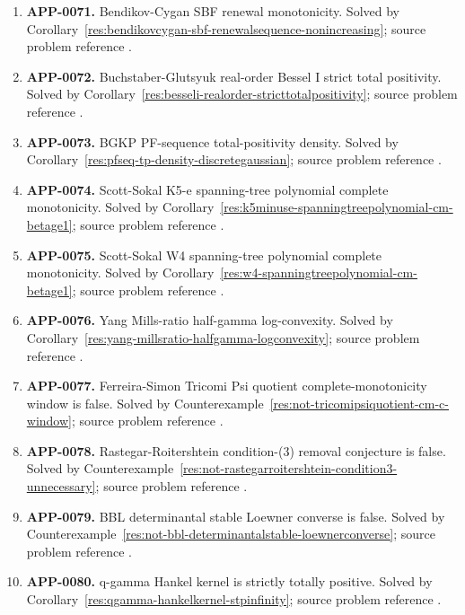 \documentclass[11pt]{article}
\numberwithin{equation}{section}
\theoremstyle{definition}
\theoremstyle{remark}
\newcommand{\1}{\mathbf 1}
\begin{document}
\begin{enumerate}
\item \label{ledger:app-0071}\textbf{APP-0071.} Bendikov-Cygan SBF renewal monotonicity. Solved by Corollary~\ref{res:bendikovcygan-sbf-renewalsequence-nonincreasing}; source problem reference \cite{app-app-0071-source}.
\item \label{ledger:app-0072}\textbf{APP-0072.} Buchstaber-Glutsyuk real-order Bessel I strict total positivity. Solved by Corollary~\ref{res:besseli-realorder-stricttotalpositivity}; source problem reference \cite{app-app-0072-source}.
\item \label{ledger:app-0073}\textbf{APP-0073.} BGKP PF-sequence total-positivity density. Solved by Corollary~\ref{res:pfseq-tp-density-discretegaussian}; source problem reference \cite{app-app-0073-source}.
\item \label{ledger:app-0074}\textbf{APP-0074.} Scott-Sokal K5-e spanning-tree polynomial complete monotonicity. Solved by Corollary~\ref{res:k5minuse-spanningtreepolynomial-cm-betage1}; source problem reference \cite{app-app-0074-source}.
\item \label{ledger:app-0075}\textbf{APP-0075.} Scott-Sokal W4 spanning-tree polynomial complete monotonicity. Solved by Corollary~\ref{res:w4-spanningtreepolynomial-cm-betage1}; source problem reference \cite{app-app-0074-source}.
\item \label{ledger:app-0076}\textbf{APP-0076.} Yang Mills-ratio half-gamma log-convexity. Solved by Corollary~\ref{res:yang-millsratio-halfgamma-logconvexity}; source problem reference \cite{app-app-0076-source}.
\item \label{ledger:app-0077}\textbf{APP-0077.} Ferreira-Simon Tricomi Psi quotient complete-monotonicity window is false. Solved by Counterexample~\ref{res:not-tricomipsiquotient-cm-c-window}; source problem reference \cite{app-app-0077-source}.
\item \label{ledger:app-0078}\textbf{APP-0078.} Rastegar-Roitershtein condition-(3) removal conjecture is false. Solved by Counterexample~\ref{res:not-rastegarroitershtein-condition3-unnecessary}; source problem reference \cite{app-app-0078-source}.
\item \label{ledger:app-0079}\textbf{APP-0079.} BBL determinantal stable Loewner converse is false. Solved by Counterexample~\ref{res:not-bbl-determinantalstable-loewnerconverse}; source problem reference \cite{app-app-0079-source}.
\item \label{ledger:app-0080}\textbf{APP-0080.} q-gamma Hankel kernel is strictly totally positive. Solved by Corollary~\ref{res:qgamma-hankelkernel-stpinfinity}; source problem reference \cite{app-app-0080-source}.

\end{enumerate}
\end{document}
